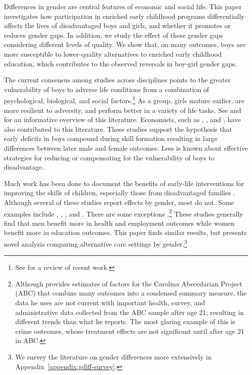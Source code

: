 Differences in gender are central features of economic and social life. This paper investigates how participation in enriched early childhood programs differentially affects the lives of disadvantaged boys and girls, and whether it promotes or reduces gender gaps. In addition, we study the effect of these gender gaps considering different levels of quality. We show that, on many outcomes, boys are more susceptible to lower-quality alternatives to enriched early childhood education, which contributes to the observed reversals in boy-girl gender gaps. 

The current consensus among studies across disciplines points to the greater vulnerability of boys to adverse life conditions from a combination of psychological, biological, and social factors.\footnote{See \citet{Golding_Fitzgerald_2017_IMHJ} for a review of recent work.} As a group, girls mature earlier, are more resilient to adversity, and perform better in a variety of life tasks. See \citet{Eliot_Brain_2009_BOOK} and \citet{Schore_2017_IMHJ} for an informative overview of this literature. Economists, such as \citet{Bertrand_Pan_2013_AEJAE}, \citet{Kottelenberg_Lehrer_2014_Gender-Effects}, and \citet{Autor-etal_2015_Family-Disadvantage}, have also contributed to this literature. These studies support the hypothesis that early deficits in boys compound during skill formation resulting in large differences between later male and female outcomes. Less is known about effective strategies for reducing or compensating for the vulnerability of boys to disadvantage.

Much work has been done to document the benefits of early-life interventions for improving the skills of children, especially those from disadvantaged families \citep{Currie_2011_AER,Elango_Hojman_etal_2016_Early-Edu}. Although several of these studies report effects by gender, most do not. Some examples include \citet{Bernal_Keane_2011_JoLE}, \citet{Cascio_Schanzenbach_2013_ImpactsExpandingAccess}, \citet{Bitler_et_al_2014_Head_Start_Unpublished}, and \citet{Kline_Walters_2016_QJE}. There are some exceptions \citep{Anderson_2008_JASA,Heckman_Moon_etal_2010_QE,Campbell_Conti_etal_2014_EarlyChildhoodInvestments,Garcia_Heckman_Leaf_etal_2017_Comp_CBA_Unpublished}.\footnote{Although \citet{Anderson_2008_JASA} provides estimates of factors for the Carolina Abecedarian Project (ABC) that combine many outcomes into a condensed summary measure, the data he uses are not current with important health, survey, and administrative data collected from the ABC sample after age 21, resulting in different trends than what he reports. The most glaring example of this is crime outcomes, whose treatment effects are not significant until after age 21 in ABC.} These studies generally find that men benefit more in health and employment outcomes while women benefit more in education outcomes. This paper finds similar results, but presents novel analysis comparing alternative care settings by gender.\footnote{We survey the literature on gender differences more extensively in Appendix~\ref{appendix:gdiff-survey}.} 

